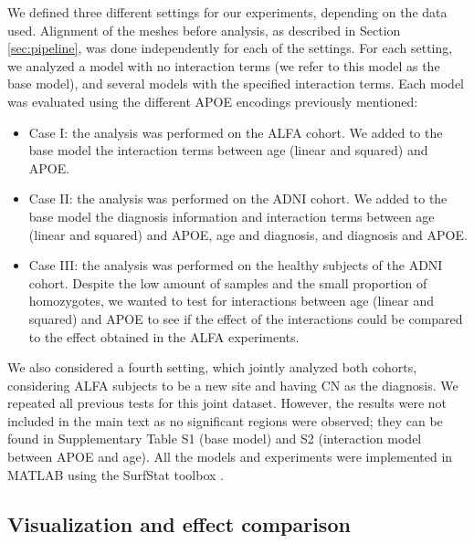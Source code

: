 We defined three different settings for our experiments, depending on the data used. Alignment of the meshes before analysis, as described in Section \ref{sec:pipeline}, was done independently for each of the settings. For each setting, we analyzed a model with no interaction terms (we refer to this model as the base model), and several models with the specified interaction terms. Each model was evaluated using the different APOE encodings previously mentioned:

\begin{itemize}
    \item Case I: the analysis was performed on the ALFA cohort. We added to the base model the interaction terms between age (linear and squared) and APOE. 
    \item Case II: the analysis was performed on the ADNI cohort. We added to the base model the diagnosis information and interaction terms between age (linear and squared) and APOE, age and diagnosis, and diagnosis and APOE.
    \item Case III: the analysis was performed on the healthy subjects of the ADNI cohort. Despite the low amount of samples and the small proportion of homozygotes, we wanted to test for interactions between age (linear and squared) and APOE to see if the effect of the interactions could be compared to the effect obtained in the ALFA experiments.
\end{itemize}

We also considered a fourth setting, which jointly analyzed both cohorts, considering ALFA subjects to be a new site and having CN as the diagnosis. We repeated all previous tests for this joint dataset. However, the results were not included in the main text as no significant regions were observed; they can be found in Supplementary Table S1 (base model) and S2 (interaction model between APOE and age). All the models and experiments were implemented in MATLAB using the SurfStat toolbox \cite{Worsley2009}.\\ 

\subsection{Visualization and effect comparison}
\label{sec:visualization}

